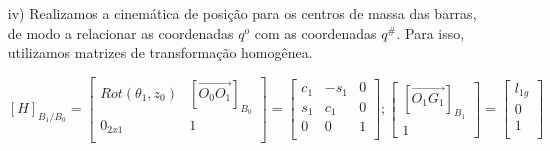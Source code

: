 \documentclass[12pt,a4paper]{article}
\begin{document}
\begin{itemize}
\begin{itemize}
\begin{multicols}{3}
	\end{multicols}
	
	Como é conveniente que as velocidades generalizadas $p$ sejam velocidades absolutas, escolhemos as componentes de $p$ como sendo as mesmas componentes de $\nu$, respeitando a ordenação indicada acima. \\ 

	No caso do mecanismo $\underline{R}\underline{R}$, temos:

	\begin{equation}
	\omega^{\#} = \begin{bmatrix}
	\omega_{z1} \\
	\omega_{z2}
	\end{bmatrix}
	\end{equation}
	
	\begin{equation}
	v^{\#} = \emptyset
	\end{equation}		
	
	\begin{equation}
	\omega^o = \emptyset
	\end{equation}		
	
	\begin{equation}
	v^o = \begin{bmatrix}
	v_{x1} & v_{y1} & v_{x2} & v_{y2}
	\end{bmatrix}^T
	\end{equation}\\

	Com $n_1 = 2$, $n_2 = 0$, $m_{p1} = 0$, $m_{p2} = 4$ e $m_p = m_{p1} + m_{p2} = 4$. \\
	
		\item[iv)] Realizamos a cinemática de posição para os centros de massa das barras, de modo a relacionar as coordenadas $q^o$ com as coordenadas $q^{\#}$. Para isso, utilizamos matrizes de transformação homogênea.



	$$ [H]_{B_1/B_0} =
	\begin{bmatrix}
	 Rot(\theta_1, z_0) & [\overrightarrow{O_0 O_1}]_{B_0} \\
	 0_{2x1} & 1 \\
	\end{bmatrix}
	=
	\begin{bmatrix}
	 c_1 & -s_1 & 0 \\
	 s_1 & c_1 & 0 \\
	 0 & 0 & 1 \\
	\end{bmatrix} ;
	\begin{bmatrix}
	[\overrightarrow{O_1 G_1}]_{B_1} \\
	1
	\end{bmatrix}
	=
	\begin{bmatrix}
	l_{1g} \\
	0 \\
	1 \\
	\end{bmatrix}
	$$


\end{itemize}
\end{itemize}
\end{document}
